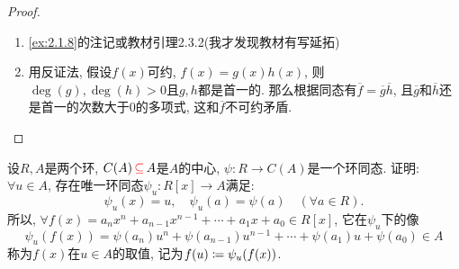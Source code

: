 \begin{proof}
    \begin{enumerate}[(1)]
        \item \ref{ex:2.1.8}的注记或教材引理2.3.2(我才发现教材有写延拓)
        \item 用反证法, 假设$f(x)$可约, $f(x) = g(x)h(x)$, 则$\deg(g), \deg(h) > 0$且$g, h$都是首一的. 那么根据同态有$\overline{f} = \overline{g}\overline{h}$, 且$\overline{g}$和$\overline{h}$还是首一的次数大于$0$的多项式, 这和$\overline{f}$不可约矛盾.
    \end{enumerate}
\end{proof}

\begin{problem}\label{ex:2.3.7}
    设$R, A$是两个环, $C(A) \,\textcolor{red}{\subseteq}\, A$是$A$的中心, $\psi:R \to C(A)$是一个环同态. 证明: $\forall u \in A$, 存在唯一环同态$\psi_u:R[x] \to A$满足:
    \[
        \psi_u(x) = u,\quad \psi_u(a) = \psi(a) \quad (\forall a \in R).
    \]
    所以, $\forall f(x) = a_nx^n + a_{n - 1}x^{n - 1} + \cdots + a_1x + a_0 \in R[x]$, 它在$\psi_u$下的像
    \[
        \psi_u(f(x)) = \psi(a_n)u^n + \psi(a_{n - 1})u^{n - 1} + \cdots + \psi(a_1)u + \psi(a_0) \in A
    \]
    称为$f(x)$在$u \in A$的取值, 记为$f(u) \mathrel{\coloneqq} \psi_u(f(x))$.
\end{problem}

